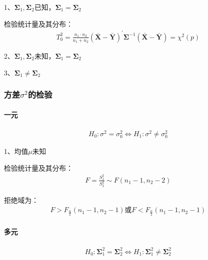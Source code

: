\documentclass[12pt]{book}
\begin{document}
1、$\bm{\Sigma}_1,\bm{\Sigma}_2$已知，$\bm{\Sigma}_1=\bm{\Sigma}_2$

检验统计量及其分布：
\begin{gather*}
    T_0^2 =\frac{n_1\cdot n_2}{n_1+n_2}\left(\bar{\bm{X}}-\bar{\bm{Y}}\right)^\prime\bm{\Sigma}^{-1}\left(\bar{\bm{X}}-\bar{\bm{Y}}\right)=\chi^2\left(p\right)
\end{gather*}

2、$\bm{\Sigma}_1,\bm{\Sigma}_2$未知，$\bm{\Sigma}_1=\bm{\Sigma}_2$

3、$\bm{\Sigma}_1\neq\bm{\Sigma}_2$

\subsubsection{方差$\sigma^2$的检验}

\paragraph{一元}

\begin{gather*}
    H_0:\sigma^2=\sigma_0^2\Leftrightarrow H_1:\sigma^2\neq\sigma_0^2
\end{gather*}


1、均值$\mu$未知

检验统计量及其分布：
\begin{gather*}
    F=\frac{S_1^2}{S_2^2}\sim F(n_1-1,n_2-2)
\end{gather*}


拒绝域为：
\begin{gather*}
    F>F_{\frac{\alpha}{2}}(n_1-1,n_2-1)
    \text{或}
    F<F_{\frac{\alpha}{2}}(n_1-1,n_2-1)
\end{gather*}


\paragraph{多元}

\begin{gather*}
    H_0:\bm{\Sigma}_1^2=\bm{\Sigma}_2^2	\Leftrightarrow H_1:\bm{\Sigma}_1^2\neq\bm{\Sigma}_2^2
\end{gather*}
\end{document}
